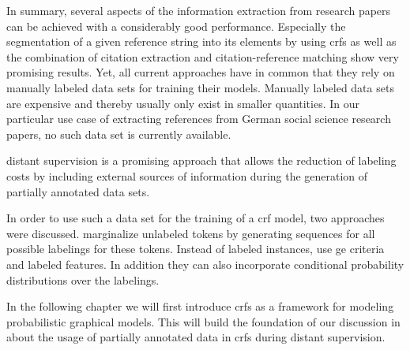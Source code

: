 In summary, several aspects of the information extraction from research papers can be achieved with a considerably good performance.
Especially the segmentation of a given reference string into its elements by using \glspl{crf} \citep{peng2004accurate,councill2008parscit,groza2012reference} as well as the combination of citation extraction and citation-reference matching \citep{powley2007evidence} show very promising results.
Yet, all current approaches have in common that they rely on manually labeled data sets for training their models.
Manually labeled data sets are expensive and thereby usually only exist in smaller quantities.
In our particular use case of extracting references from German social science research papers, no such data set is currently available.

\Gls{distant supervision} is a promising approach that allows the reduction of labeling costs by including external sources of information during the generation of partially annotated data sets.

In order to use such a data set for the training of a \gls{crf} model, two approaches were discussed.
\citet{tsuboi2008training} marginalize unlabeled tokens by generating sequences for all possible labelings for these tokens.
Instead of labeled instances, \citet{mann2008generalized} use \gls{ge} criteria and labeled features.
In addition they can also incorporate \glspl{conditional probability distribution} over the labelings.

In the following chapter we will first introduce \glspl{crf} as a framework for modeling \glspl{probabilistic graphical model}.
This will build the foundation of our discussion in  about the usage of partially annotated data in \glspl{crf} during \gls{distant supervision}.

